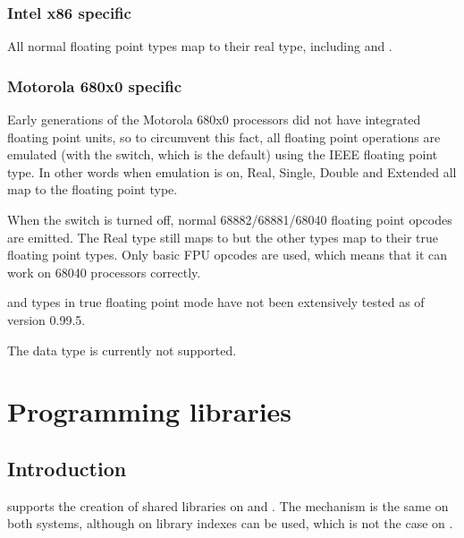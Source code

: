 \subsection{Intel x86 specific}

All normal floating point types map to their real type, including
 and .

\subsection{Motorola 680x0 specific}

Early generations of the Motorola 680x0 processors did not have integrated
floating point units, so to circumvent this fact, all floating point
operations are emulated (with the  switch, which is the default)
using the IEEE  floating point type. In other words when
emulation is on, Real, Single, Double and Extended all map to the
 floating point type.

When the  switch is turned off, normal 68882/68881/68040
floating point opcodes are emitted. The Real type still maps to
 but the other types map to their true floating point
types. Only basic FPU opcodes are used, which means that it can
work on 68040 processors correctly.

\begin{remark} and  types in true floating
point mode have not been extensively tested as of version 0.99.5.
\end{remark}
\begin{remark}The  data type is currently not supported.
\end{remark}

\chapter{Programming libraries}
\label{ch:libraries}
\section{Introduction}
\fpc supports the creation of shared libraries on \linux and \windows.
The mechanism is the same on both systems, although on \windows library
indexes can be used, which is not the case on \linux.

